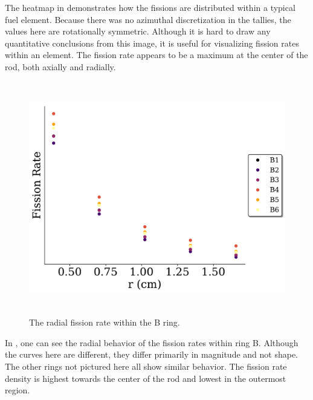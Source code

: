 The heatmap in  demonstrates how the fissions are distributed within a typical fuel element.
Because there was no azimuthal discretization in the tallies, the values here are rotationally symmetric.
Although it is hard to draw any quantitative conclusions from this image, it is useful for visualizing fission rates within an element.
The fission rate appears to be a maximum at the center of the rod, both axially and radially.

\begin{figure}[htb]
\centering
\includegraphics[height=4in]{tex/figures/radial_rr_density_B.pdf}
\caption[Radial Fission Rate Density B]{The radial fission rate within the B ring.}
\label{fig:radial_rr_density_B}
\end{figure}

In , one can see the radial behavior of the fission rates within ring B.
Although the curves here are different, they differ primarily in magnitude and not shape.
The other rings not pictured here all show similar behavior.
The fission rate density is highest towards the center of the rod and lowest in the outermost region.

